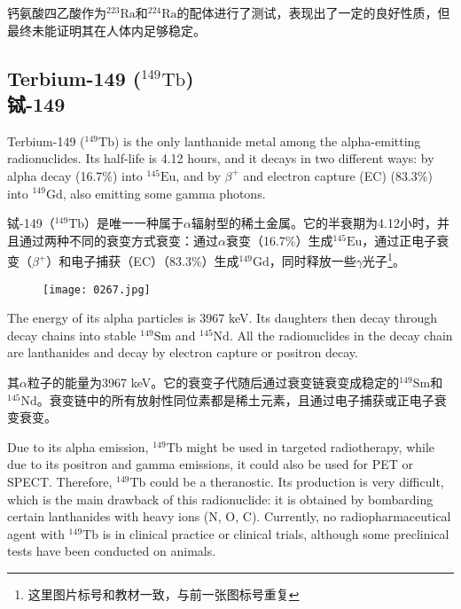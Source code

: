 \documentclass[dvipsnames, svgnames,a4paper,11pt]{article}
\begin{document}
钙氨酸四乙酸作为\(\mathrm{^{223}Ra}\)和\(\mathrm{^{224}Ra}\)的配体进行了测试，表现出了一定的良好性质，但最终未能证明其在人体内足够稳定。




\subsection{Terbium-149 (\(\mathrm{^{149}Tb}\))\\铽-149}  
Terbium-149 (\(\mathrm{^{149}Tb}\)) is the only lanthanide metal among the alpha-emitting radionuclides. Its half-life is 4.12 hours, and it decays in two different ways: by alpha decay (16.7\%) into \(\mathrm{^{145}Eu}\), and by \(\beta^+\) and electron capture (EC) (83.3\%) into \(\mathrm{^{149}Gd}\), also emitting some gamma photons.  
 
铽-149（\(\mathrm{^{149}Tb}\)）是唯一一种属于$\alpha$辐射型的稀土金属。它的半衰期为4.12小时，并且通过两种不同的衰变方式衰变：通过$\alpha$衰变（16.7\%）生成\(\mathrm{^{145}Eu}\)，通过正电子衰变（\(\beta^+\)）和电子捕获（EC）（83.3\%）生成\(\mathrm{^{149}Gd}\)，同时释放一些$\gamma$光子\footnote{这里图片标号和教材一致，与前一张图标号重复}。  

\setcounter{figure}{355}  

\begin{figure}[h]
	\centering
    \texttt{[image: 0267.jpg]}  
     \label{fig356a}
\end{figure}

The energy of its alpha particles is 3967 keV. Its daughters then decay through decay chains into stable \(\mathrm{^{149}Sm}\) and \(\mathrm{^{145}Nd}\). All the radionuclides in the decay chain are lanthanides and decay by electron capture or positron decay.  

其$\alpha$粒子的能量为3967 keV。它的衰变子代随后通过衰变链衰变成稳定的\(\mathrm{^{149}Sm}\)和\(\mathrm{^{145}Nd}\)。衰变链中的所有放射性同位素都是稀土元素，且通过电子捕获或正电子衰变衰变。  

Due to its alpha emission, \(\mathrm{^{149}Tb}\) might be used in targeted radiotherapy, while due to its positron and gamma emissions, it could also be used for PET or SPECT. Therefore, \(\mathrm{^{149}Tb}\) could be a theranostic. Its production is very difficult, which is the main drawback of this radionuclide: it is obtained by bombarding certain lanthanides with heavy ions (N, O, C). Currently, no radiopharmaceutical agent with \(\mathrm{^{149}Tb}\) is in clinical practice or clinical trials, although some preclinical tests have been conducted on animals.
\end{document}
